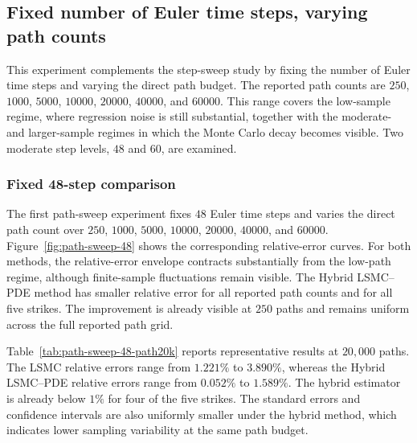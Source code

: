 \documentclass[pdflatex,sn-mathphys-num]{sn-jnl}
\theoremstyle{thmstyleone}%
\theoremstyle{thmstylethree}%
\theoremstyle{thmstyletwo}%
\begin{document}
\subsection{Fixed number of Euler time steps, varying path counts}

This experiment complements the step-sweep study by fixing the number of Euler time steps and varying the direct path budget. The reported path counts are \(250\), \(1000\), \(5000\), \(10000\), \(20000\), \(40000\), and \(60000\). This range covers the low-sample regime, where regression noise is still substantial, together with the moderate- and larger-sample regimes in which the Monte Carlo decay becomes visible. Two moderate step levels, \(48\) and \(60\), are examined.

\subsubsection*{Fixed 48-step comparison}
The first path-sweep experiment fixes \(48\) Euler time steps and varies the direct path count over \(250\), \(1000\), \(5000\), \(10000\), \(20000\), \(40000\), and \(60000\). Figure~\ref{fig:path-sweep-48} shows the corresponding relative-error curves. For both methods, the relative-error envelope contracts substantially from the low-path regime, although finite-sample fluctuations remain visible. The Hybrid LSMC--PDE method has smaller relative error for all reported path counts and for all five strikes. The improvement is already visible at \(250\) paths and remains uniform across the full reported path grid.

Table~\ref{tab:path-sweep-48-path20k} reports representative results at \(20{,}000\) paths. The LSMC relative errors range from \(1.221\%\) to \(3.890\%\), whereas the Hybrid LSMC--PDE relative errors range from \(0.052\%\) to \(1.589\%\). The hybrid estimator is already below \(1\%\) for four of the five strikes. The standard errors and confidence intervals are also uniformly smaller under the hybrid method, which indicates lower sampling variability at the same path budget.
\end{document}
